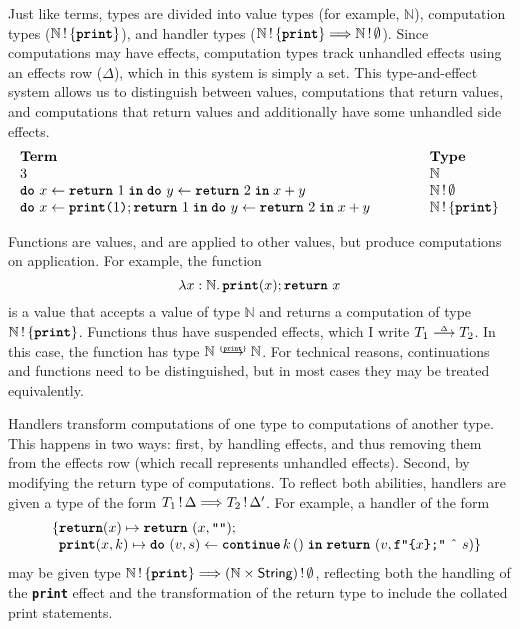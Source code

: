 Just like terms, types are divided into value types (for example, $\mathbb{N}$), computation types ($\effectType[\{\textbf{\texttt{print}} \}]{\mathbb{N}}$), and handler types ($\handlerType{\effectType[\{\textbf{\texttt{print}} \}]{\mathbb{N}}}{\effectType[\emptyset]{\mathbb{N}}}$). Since computations may have effects, computation types track unhandled effects using an effects row ($\Delta$), which in this system is simply a set. This type-and-effect system allows us to distinguish between values, computations that return values, and computations that return values and additionally have some unhandled side effects.
\[
\begin{array}{lll}
  \textbf{Term} &\hspace{8mm}& \textbf{Type} \\
  3 && \mathbb{N} \\ 
  \bind{x}{\return{1}}{\bind{y}{\return{2}}{x + y}} &&  \effectType[\emptyset]{\mathbb{N}} \\ 
  \bind{x}{\texttt{\textbf{print}($1$)}; \return{1}}{\bind{y}{\return{2}}{x + y}} &&  \effectType[\{ \texttt{\textbf{print}}\}]{\mathbb{N}} \\ 
\end{array}
\]

Functions are values, and are applied to other values, but produce computations on application. For example, the function 
\[
\function{x:\mathbb{N}}{\, \textbf{\texttt{print}}(x); \return{x}}
\]
is a value that accepts a value of type $\mathbb{N}$ and returns a computation of type $\effectType[\{\textbf{\texttt{print}} \}]{\mathbb{N}}$. Functions thus have suspended effects, which I write $\functionType{T_1}{T_2}$. In this case, the function has type $\functionType[\{ \textbf{\texttt{print}} \}]{\mathbb{N}}{\mathbb{N}}$. For technical reasons, continuations and functions need to be distinguished, but in most cases they may be treated equivalently. 

Handlers transform computations of one type to computations of another type. This happens in two ways: first, by handling effects, and thus removing them from the effects row (which recall represents unhandled effects). Second, by modifying the return type of computations. To reflect both abilities, handlers are given a type of the form $\handlerType{\effectType{T_1}}{\effectType[\Delta']{T_2}}$. For example, a handler of the form  
\[ \begin{array}{ll}
  \quad \{ \textbf{\texttt{return}}(x) \mapsto {\return{(x, \texttt{""})}}; \\
    \quad \, \,\, \textbf{\texttt{print}}(x, k) \mapsto {\bind{(v, s)}{\continue{k}{()}}{\return{(v, \texttt{f"\{$x$\};"} \text{ \^\ } s)}}}\}
  \end{array}
\]
may be given type $\handlerType{\effectType[\{ \textbf{\texttt{print}} \}]{\mathbb{N}}}{\effectType[\emptyset]{(\mathbb{N} \times \textsf{String})}}$, reflecting both the handling of the \textbf{\texttt{print}} effect and the transformation of the return type to include the collated print statements.

